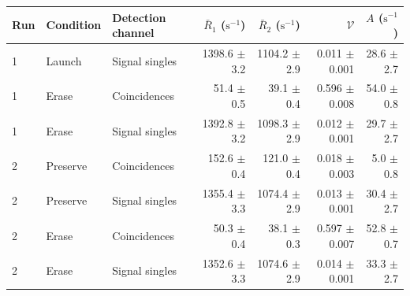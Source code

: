 \begin{tabular}{lllrrrr}
\toprule
Run & Condition & Detection channel & $\bar R_1$ ($\mathrm{s}^{-1}$) & $\bar R_2$ ($\mathrm{s}^{-1}$) & $\mathcal{V}$ & $A$ ($\mathrm{s}^{-1}$) \\
\midrule
1 & Launch & Signal singles & 1398.6 \ensuremath{\pm} 3.2 & 1104.2 \ensuremath{\pm} 2.9 & 0.011 \ensuremath{\pm} 0.001 & 28.6 \ensuremath{\pm} 2.7 \\
1 & Erase & Coincidences & 51.4 \ensuremath{\pm} 0.5 & 39.1 \ensuremath{\pm} 0.4 & 0.596 \ensuremath{\pm} 0.008 & 54.0 \ensuremath{\pm} 0.8 \\
1 & Erase & Signal singles & 1392.8 \ensuremath{\pm} 3.2 & 1098.3 \ensuremath{\pm} 2.9 & 0.012 \ensuremath{\pm} 0.001 & 29.7 \ensuremath{\pm} 2.7 \\
2 & Preserve & Coincidences & 152.6 \ensuremath{\pm} 0.4 & 121.0 \ensuremath{\pm} 0.4 & 0.018 \ensuremath{\pm} 0.003 & 5.0 \ensuremath{\pm} 0.8 \\
2 & Preserve & Signal singles & 1355.4 \ensuremath{\pm} 3.3 & 1074.4 \ensuremath{\pm} 2.9 & 0.013 \ensuremath{\pm} 0.001 & 30.4 \ensuremath{\pm} 2.7 \\
2 & Erase & Coincidences & 50.3 \ensuremath{\pm} 0.4 & 38.1 \ensuremath{\pm} 0.3 & 0.597 \ensuremath{\pm} 0.007 & 52.8 \ensuremath{\pm} 0.7 \\
2 & Erase & Signal singles & 1352.6 \ensuremath{\pm} 3.3 & 1074.6 \ensuremath{\pm} 2.9 & 0.014 \ensuremath{\pm} 0.001 & 33.3 \ensuremath{\pm} 2.7 \\
\bottomrule
\end{tabular}
